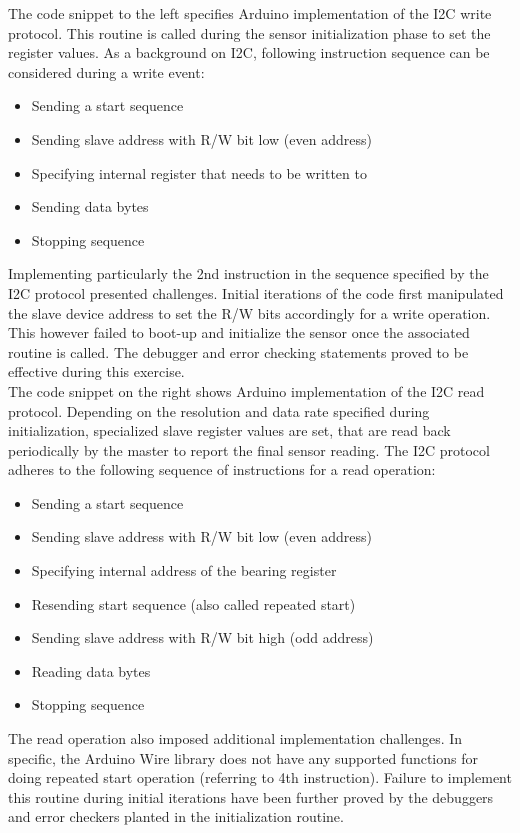 \documentclass{article}
\begin{document}
\noindent The code snippet to the left specifies Arduino implementation of the I2C write protocol. This routine is called during the sensor initialization phase to set the register values. As a background on I2C, following instruction sequence can be considered during a write event:

\begin{itemize}
\item Sending a start sequence
\item Sending slave address with R/W bit low (even address)
\item Specifying internal register that needs to be written to
\item Sending data bytes
\item Stopping sequence 
\end{itemize}

\noindent Implementing particularly the 2nd instruction in the sequence specified by the I2C protocol presented challenges. Initial iterations of the code first manipulated the slave device address to set the R/W bits accordingly for a write operation. This however failed to boot-up and initialize the sensor once the associated routine is called. The debugger and error checking statements proved to be effective during this exercise. \\

\noindent The code snippet on the right shows Arduino implementation of the I2C read protocol. Depending on the resolution and data rate specified during initialization, specialized slave register values are set, that are read back periodically by the master to report the final sensor reading. The I2C protocol adheres to the following sequence of instructions for a read operation:

\begin{itemize}
\item Sending a start sequence
\item Sending slave address with R/W bit low (even address)
\item Specifying internal address of the bearing register
\item Resending start sequence (also called repeated start)
\item Sending slave address with R/W bit high (odd address)
\item Reading data bytes
\item Stopping sequence 
\end{itemize}

\noindent The read operation also imposed additional implementation challenges. In specific, the Arduino Wire library does not have any supported functions for doing repeated start operation (referring to 4th instruction). Failure to implement this routine during initial iterations have been further proved by the debuggers and error checkers planted in the initialization routine. \\
\end{document}
